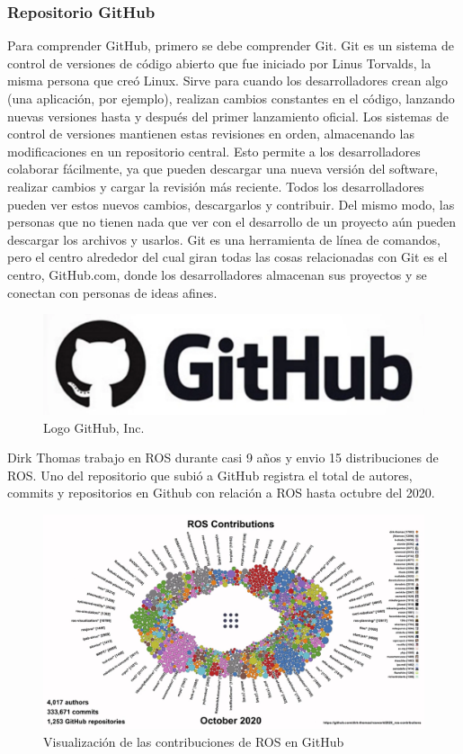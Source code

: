         \subsubsection{Repositorio GitHub}
            Para comprender GitHub, primero se debe comprender Git. Git es un sistema de control de versiones de código abierto que fue iniciado por Linus Torvalds, la misma persona que creó Linux. Sirve para cuando los desarrolladores crean algo (una aplicación, por ejemplo), realizan cambios constantes en el código, lanzando nuevas versiones hasta y después del primer lanzamiento oficial. Los sistemas de control de versiones mantienen estas revisiones en orden, almacenando las modificaciones en un repositorio central. Esto permite a los desarrolladores colaborar fácilmente, ya que pueden descargar una nueva versión del software, realizar cambios y cargar la revisión más reciente. Todos los desarrolladores pueden ver estos nuevos cambios, descargarlos y contribuir. Del mismo modo, las personas que no tienen nada que ver con el desarrollo de un proyecto aún pueden descargar los archivos y usarlos. Git es una herramienta de línea de comandos, pero el centro alrededor del cual giran todas las cosas relacionadas con Git es el centro, GitHub.com, donde los desarrolladores almacenan sus proyectos y se conectan con personas de ideas afines.
    
            \begin{figure}[htb]
            \centering
            \includegraphics[width=0.23\linewidth]{Main/Chapter3/Images3/repo_git_1.png}
            \caption{Logo GitHub, Inc.}
            \label{f:Cap3-5_estadisticas_8}
            \end{figure} 
        
            Dirk Thomas trabajo en ROS durante casi 9 años y envio 15 distribuciones de ROS. Uno del repositorio que subió a GitHub registra el total de autores, commits y repositorios en Github con relación a ROS hasta octubre del 2020.
        
            \begin{figure}[htb]
            \centering
            \includegraphics[width=0.99\linewidth]{Main/Chapter3/Images3/repo_git_2.png}
            \caption{Visualización de las contribuciones de ROS en GitHub \cite{gitreposito}}
            \label{f:Cap3-5_estadisticas_9}
            \end{figure} 
    
